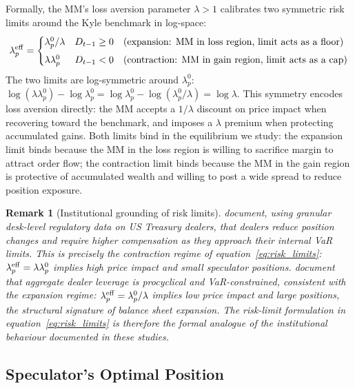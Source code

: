 \documentclass[12pt,a4paper]{article}
\newtheorem{remark}[theorem]{Remark}
\theoremstyle{definition}
\begin{document}
Formally, the MM's loss aversion parameter $\lambda > 1$ calibrates
two symmetric risk limits around the Kyle benchmark in log-space:
\begin{equation}
  \lambda^{\rm eff}_p =
  \begin{cases}
    \lambda^0_p/\lambda
      & D_{t-1} \geq 0 \quad\text{(expansion: MM in loss region,
        limit acts as a floor)} \\[4pt]
    \lambda\lambda^0_p
      & D_{t-1} < 0 \quad\text{(contraction: MM in gain region,
        limit acts as a cap)}
  \end{cases}
  \label{eq:risk_limits}
\end{equation}
The two limits are log-symmetric around $\lambda^0_p$:
$\log(\lambda\lambda^0_p) - \log\lambda^0_p =
\log\lambda^0_p - \log(\lambda^0_p/\lambda) = \log\lambda$.
This symmetry encodes loss aversion directly: the MM accepts a
$1/\lambda$ discount on price impact when recovering toward the
benchmark, and imposes a $\lambda$ premium when protecting accumulated
gains. Both limits bind in the equilibrium we study: the expansion
limit binds because the MM in the loss region is willing to sacrifice
margin to attract order flow; the contraction limit binds because the
MM in the gain region is protective of accumulated wealth and willing
to post a wide spread to reduce position exposure.

\begin{remark}[Institutional grounding of risk limits]
\label{rem:varlimits}
\citet{li2025} document, using granular desk-level regulatory data on
US Treasury dealers, that dealers reduce position changes and require
higher compensation as they approach their internal VaR limits. This
is precisely the contraction regime of equation~\eqref{eq:risk_limits}:
$\lambda^{\rm eff}_p = \lambda\lambda^0_p$ implies high price impact
and small speculator positions. \citet{adrian2014} document that
aggregate dealer leverage is procyclical and VaR-constrained,
consistent with the expansion regime: $\lambda^{\rm eff}_p =
\lambda^0_p/\lambda$ implies low price impact and large positions,
the structural signature of balance sheet expansion. The risk-limit
formulation in equation~\eqref{eq:risk_limits} is therefore the formal
analogue of the institutional behaviour documented in these studies.
\end{remark}

\subsection{Speculator's Optimal Position}
\label{sec:speculator}
\end{document}
